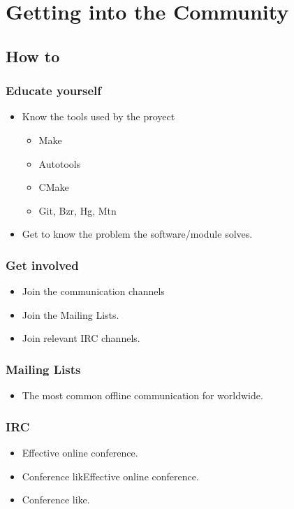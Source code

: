 \documentclass[hyperref={pdfpagelabels=false},xcolor=pst,pdf,fragile]{beamer}
\begin{document}
\section{Getting into the Community}

\subsection{How to}

\begin{frame}
  \frametitle{Educate yourself}

  \begin{itemize}
	\item Know the tools used by the proyect
	  \begin{itemize}
		\item Make
		\item Autotools
		\item CMake
		\item Git, Bzr, Hg, Mtn
	  \end{itemize}
	\item Get to know the problem the software/module solves.
  \end{itemize}

\end{frame}

\begin{frame}
  \frametitle{Get involved}

  \begin{itemize}
	\item Join the communication channels
	\item Join the Mailing Lists.
	\item Join relevant IRC channels.
  \end{itemize}

\end{frame}

\begin{frame}
  \frametitle{Mailing Lists}

  \begin{itemize}
	\item The most common offline communication for worldwide.
  \end{itemize}

\end{frame}

\begin{frame}
  \frametitle{IRC}

  \begin{itemize}
	\item Effective online conference.
	\item Conference likEffective online conference.
	\item Conference like.
  \end{itemize}

\end{frame}
\end{document}
